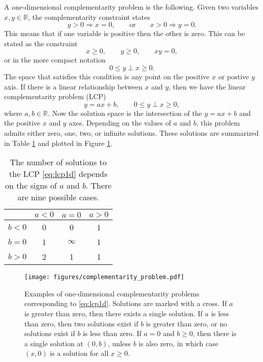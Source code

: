 A one-dimensional complementarity problem is the following. Given two variables $x, y\in \mathbb{R}$, the complementarity constraint states
\[ y > 0 \Rightarrow x = 0, \qquad \text{or}\qquad x > 0 \Rightarrow y = 0.\]
This means that if one variable is positive then the other is zero. This can be stated as the constraint
\[ x \geq 0, \qquad y\geq 0,\qquad xy = 0,\]
or in the more compact notation
\[ 0 \leq y \perp x\geq 0.\]
The space that satisfies this condition is any point on the positive $x$ or postive $y$ axis. If there is a linear relationship between $x$ and $y$, then we have the linear complementarity problem (LCP)
\begin{equation}\label{eq:lcp1d}
	y = ax + b,\qquad 0\leq y \perp x\geq 0,
\end{equation}
where $a,b\in\mathbb{R}$. Now the solution space is the intersection of the $y=ax + b$ and the positive $x$ and $y$ axes. Depending on the values of $a$ and $b$, this problem admits either zero, one, two, or infinite solutions. These solutions are summarized in Table \ref{tab:1d_comp} and plotted in Figure \ref{fig:1d_comp}.

\begin{table}[!h]
\caption[Number of possible solutions for a one-dimensional complementarity problem]{The number of solutions to the LCP \eqref{eq:lcp1d} depends on the signs of $a$ and $b$. There are nine possible cases.}\label{tab:1d_comp}
\begin{center}
\begin{tabular}{c | c | c | c |}
 & $a < 0$ & $a = 0$ & $a > 0$\\
\hline
$b < 0$ & 0 & 0 & 1\\
$b = 0$ & 1 & $\infty$ & 1\\
$b > 0$ &2 & 1 & 1
\end{tabular}
\end{center}
\end{table}

\begin{figure}[!h]
\begin{center}
\texttt{[image: figures/complementarity\_problem.pdf]}
\end{center}
\caption[One-dimensional complementarity problems]{Examples of one-dimensional complementarity problems corresponding to \eqref{eq:lcp1d}. Solutions are marked with a cross. If $a$ is greater than zero, then there exists a single solution. If $a$ is less than zero, then two solutions exist if $b$ is greater than zero, or no solutions exist if $b$ is less than zero. If $a=0$ and $b\geq 0$, then there is a single solution at $(0,b)$, unless $b$ is also zero, in which case $(x,0)$ is a solution for all $x\geq 0$. }\label{fig:1d_comp}
\end{figure}

